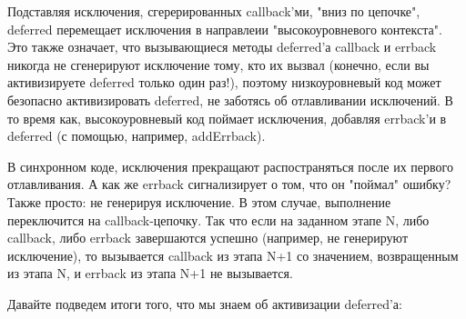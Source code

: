 Подставляя исключения, сгерерированных callback'ми, 
"вниз по цепочке", deferred перемещает исключения в 
направлеии "высокоуровневого контекста". Это также 
означает, что вызывающиеся методы deferred'а callback и errback 
никогда не сгенерируют исключение тому, кто их вызвал (конечно, 
если вы активизируете deferred только один раз!), поэтому 
низкоуровневый код может безопасно активизировать deferred, 
не заботясь об отлавливании исключений. В то время как, 
высокоуровневый код поймает исключения, добавляя 
errback'и в deferred (с помощью, например, addErrback).


В синхронном коде, исключения прекращают 
распостраняться после их первого отлавливания. 
А как же errback сигнализирует о том, что он "поймал" ошибку? 
Также просто: не генерируя исключение. В этом 
случае, выполнение переключится на callback-цепочку. Так что 
если на заданном этапе N, либо callback, либо errback завершаются 
успешно (например, не генерируют исключение), то вызывается
callback из этапа N+1 со значением, возвращенным из этапа N, и 
errback из этапа N+1 не вызывается.  


Давайте подведем итоги того, что мы знаем об активизации deferred'а:

